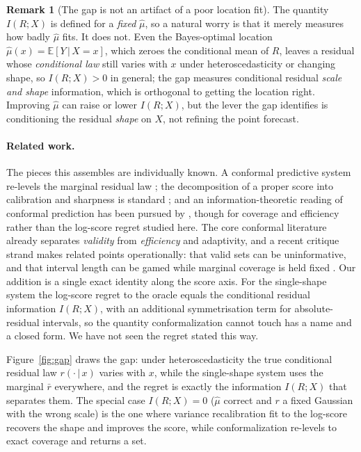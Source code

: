 \documentclass[10pt]{article} %
\theoremstyle{definition}
\newtheorem{remark}{Remark}
\newcommand{\E}{\mathbb{E}}
\newcommand{\given}{\,\vert\,}
\begin{document}
\begin{remark}[The gap is not an artifact of a poor location fit]\label{rem:mudep}
The quantity $I(R;X)$ is defined for a \emph{fixed} $\hat\mu$, so a natural worry is that it
merely measures how badly $\hat\mu$ fits. It does not. Even the Bayes-optimal location
$\hat\mu(x)=\E[Y\given X=x]$, which zeroes the conditional mean of $R$, leaves a residual
whose \emph{conditional law} still varies with $x$ under heteroscedasticity or changing
shape, so $I(R;X)>0$ in general; the gap measures conditional residual \emph{scale and
shape} information, which is orthogonal to getting the location right. Improving $\hat\mu$
can raise or lower $I(R;X)$, but the lever the gap identifies is conditioning the residual
\emph{shape} on $X$, not refining the point forecast.
\end{remark}

\paragraph{Related work.} The pieces this assembles are individually known. A conformal
predictive system re-levels the marginal residual law \citep{vovk2019nonparametric}; the
decomposition of a proper score into calibration and sharpness is standard
\citep{gneiting2007probabilistic}; and an information-theoretic reading of conformal
prediction has been pursued by \citet{correia2024information}, though for coverage and
efficiency rather than the log-score regret studied here. The core conformal literature
already separates \emph{validity} from \emph{efficiency} and adaptivity, and a recent
critique strand makes related points operationally: that valid sets can be uninformative,
and that interval length can be gamed while marginal coverage is held fixed
\citep{min2026coveragelength}. Our addition is a single exact identity along the score axis.
For the single-shape system the log-score regret to the oracle equals the conditional
residual information $I(R;X)$, with an additional symmetrisation term for absolute-residual
intervals, so the quantity conformalization cannot touch has a name and a closed form. We
have not seen the regret stated this way.

Figure~\ref{fig:gap} draws the gap: under heteroscedasticity the true conditional residual
law $r(\cdot\given x)$ varies with $x$, while the single-shape system uses the marginal
$\bar r$ everywhere, and the regret is exactly the information $I(R;X)$ that separates
them. The special case $I(R;X)=0$ ($\hat\mu$ correct and $r$ a fixed Gaussian with the
wrong scale) is the one where variance recalibration fit to the log-score recovers the
shape and improves the score, while conformalization re-levels to exact coverage and
returns a set.
\end{document}
